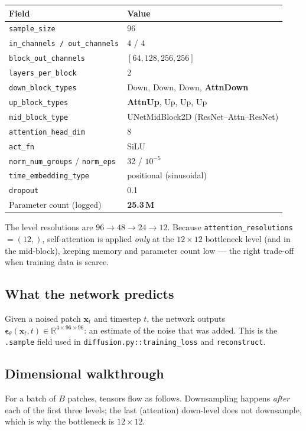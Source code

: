 \documentclass[11pt,a4paper]{article}
\newcommand{\R}{\mathbb{R}}
\newcommand{\x}{\bm{x}}
\newcommand{\eps}{\bm{\epsilon}}
\newcommand{\code}[1]{\texttt{\small #1}}
\begin{document}
\begin{longtable}{@{}ll@{}}
\toprule
Field & Value \\
\midrule
\code{sample\_size}        & 96 \\
\code{in\_channels / out\_channels} & 4 / 4 \\
\code{block\_out\_channels}& $[64, 128, 256, 256]$ \\
\code{layers\_per\_block}  & 2 \\
\code{down\_block\_types}  & Down, Down, Down, \textbf{AttnDown} \\
\code{up\_block\_types}    & \textbf{AttnUp}, Up, Up, Up \\
\code{mid\_block\_type}    & UNetMidBlock2D (ResNet–Attn–ResNet) \\
\code{attention\_head\_dim}& 8 \\
\code{act\_fn}             & SiLU \\
\code{norm\_num\_groups} / \code{norm\_eps} & 32 / $10^{-5}$ \\
\code{time\_embedding\_type}& positional (sinusoidal) \\
\code{dropout}            & 0.1 \\
Parameter count (logged)  & \textbf{25.3\,M} \\
\bottomrule
\end{longtable}

\noindent
The level resolutions are $96\!\to\!48\!\to\!24\!\to\!12$. Because
\code{attention\_resolutions}$=(12,)$, self-attention is applied \emph{only} at
the $12\times12$ bottleneck level (and in the mid-block), keeping memory and
parameter count low --- the right trade-off when training data is scarce.

\subsection{What the network predicts}
Given a noised patch $\x_t$ and timestep $t$, the network outputs
$\eps_\theta(\x_t,t)\in\R^{4\times96\times96}$: an estimate of the noise that was
added. This is the \code{.sample} field used in
\code{diffusion.py::training\_loss} and \code{reconstruct}.

\subsection{Dimensional walkthrough}
For a batch of $B$ patches, tensors flow as follows. Downsampling happens
\emph{after} each of the first three levels; the last (attention) down-level does
not downsample, which is why the bottleneck is $12\times12$.
\end{document}
